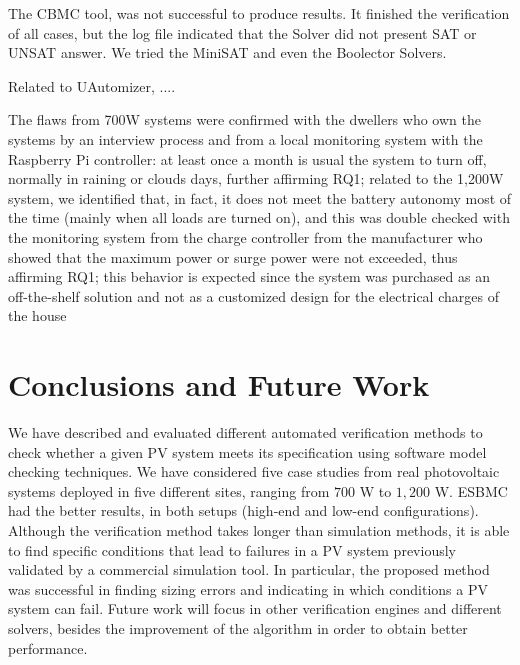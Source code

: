 \documentclass[runningheads]{llncs}
\begin{document}
The CBMC tool, was not successful to produce results. It finished the verification of all cases, but the log file indicated that the Solver did not present SAT or UNSAT answer. We tried the MiniSAT and even the Boolector Solvers.

Related to UAutomizer, ....

The flaws from 700W systems were confirmed with the dwellers who own the systems by an interview process and from a local monitoring system with the Raspberry Pi controller: at least once a month is usual the system to turn off, normally in raining or clouds days, further affirming RQ1; related to the 1,200W system, we identified that, in fact, it does not meet the battery autonomy most of the time (mainly when all loads are turned on), and this was double checked with the monitoring system from the charge controller from the manufacturer who showed that the maximum power or surge power were not exceeded, thus affirming RQ1; this behavior is expected since the system was purchased as an off-the-shelf solution and not as a customized design for the electrical charges of the house

\section{Conclusions and Future Work}
We have described and evaluated different automated verification methods to check whether a given PV system meets its specification using software model checking techniques. We have considered five case studies from real photovoltaic systems deployed in five different sites, ranging from $700$ W to $1,200$ W. ESBMC had the better results, in both setups (high-end and low-end configurations). Although the verification method takes longer than simulation methods, it is able to find specific conditions that lead to failures in a PV system previously validated by a commercial simulation tool. In particular, the proposed method was successful in finding sizing errors and indicating in which conditions a PV system can fail. Future work will focus in other verification engines and different solvers, besides the improvement of the algorithm in order to obtain better performance.
%
%
%


%
\end{document}
